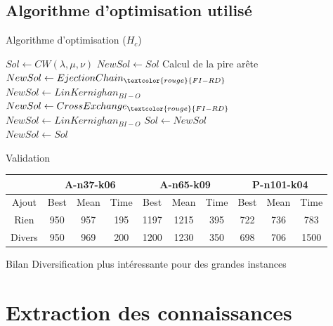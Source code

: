 \documentclass{beamer}
\begin{document}
\subsection{Algorithme d'optimisation utilisé}

\begin{frame}{Algorithme d'optimisation ($H_c$)}

\begin{algorithm}[H]
\DontPrintSemicolon %

$Sol \gets CW(\lambda,\mu,\nu)$\;
$NewSol \gets Sol$\;
 {
	Calcul de la pire arête\;
	$NewSol \gets EjectionChain_{\textcolor{rouge}{FI-RD}}$\;
	$NewSol \gets LinKernighan_{BI-O}$\;
	$NewSol \gets CrossExchange_{\textcolor{rouge}{FI-RD}}$\;
	$NewSol \gets LinKernighan_{BI-O}$\;
	 {
		$Sol \gets NewSol$\;
	}\\
	\textcolor{rouge}{
	 {  
		$NewSol \gets Sol$  
	}
	}
}
\;

\end{algorithm}

\end{frame}

\begin{frame}{Validation}

\begin{tabular}{|c|c|c|c|c|c|c|c|c|c|}
   \hline
    & \multicolumn{3}{c|}{A-n37-k06} & \multicolumn{3}{c|}{A-n65-k09} & \multicolumn{3}{c|}{P-n101-k04} \\
   \hline
   Ajout & Best & Mean & Time & Best & Mean & Time & Best & Mean & Time \\
   \hline
   Rien &  950 & 957 & 195 & 1197 & 1215 & 395 & 722 & 736 & 783  \\   
   \hline
   Divers & 950 & 969 & 200 & 1200 & 1230 & 350 & 698 & 706 & 1500  \\
   \hline
\end{tabular}

\begin{exampleblock}{Bilan}
Diversification plus intéressante pour des grandes instances
\end{exampleblock}



\end{frame}


\section{Extraction des connaissances}
\end{document}
